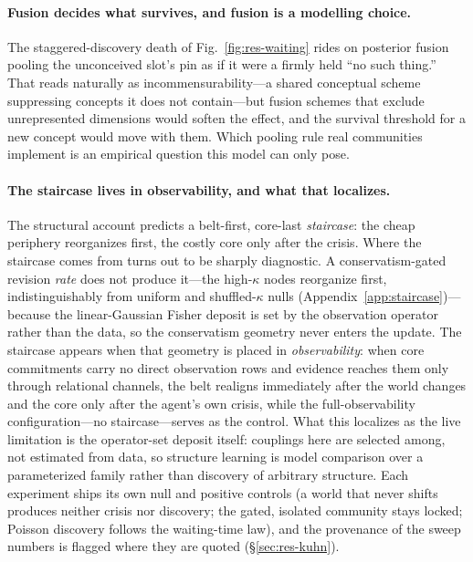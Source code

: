 \documentclass[11pt]{article}
\begin{document}
\paragraph{Fusion decides what survives, and fusion is a modelling choice.}
The staggered-discovery death of Fig.~\ref{fig:res-waiting} rides on posterior fusion pooling the
unconceived slot's pin as if it were a firmly held ``no such thing.'' That reads naturally as
incommensurability---a shared conceptual scheme suppressing concepts it does not contain---but
fusion schemes that exclude unrepresented dimensions would soften the effect, and the survival
threshold for a new concept would move with them. Which pooling rule real communities implement is
an empirical question this model can only pose.

\paragraph{The staircase lives in observability, and what that localizes.}
The structural account predicts a belt-first, core-last \emph{staircase}: the cheap periphery
reorganizes first, the costly core only after the crisis. Where the staircase comes from turns out
to be sharply diagnostic. A conservatism-gated revision \emph{rate} does not produce it---the
high-$\kappa$ nodes reorganize first, indistinguishably from uniform and shuffled-$\kappa$ nulls
(Appendix~\ref{app:staircase})---because the linear-Gaussian Fisher deposit is set by the
observation operator rather than the data, so the conservatism geometry never enters the update.
The staircase appears when that geometry is placed in \emph{observability}: when core commitments
carry no direct observation rows and evidence reaches them only through relational channels, the
belt realigns immediately after the world changes and the core only after the agent's own crisis,
while the full-observability configuration---no staircase---serves as the control. What this
localizes as the live limitation is the operator-set deposit itself: couplings here are selected
among, not estimated from data, so structure learning is model comparison over a parameterized
family rather than discovery of arbitrary structure. Each experiment ships its own null and
positive controls (a world that never shifts produces neither crisis nor discovery; the gated,
isolated community stays locked; Poisson discovery follows the waiting-time law), and the
provenance of the sweep numbers is flagged where they are quoted (\S\ref{sec:res-kuhn}).
\end{document}
